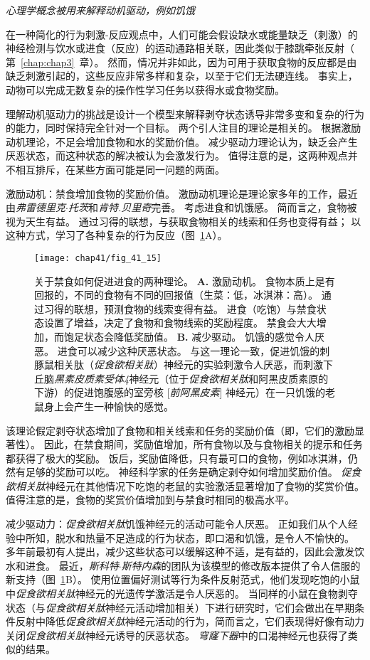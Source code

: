 \textit{心理学概念被用来解释动机驱动，例如饥饿}

在一种简化的行为刺激-反应观点中，人们可能会假设缺水或能量缺乏（刺激）的神经检测与饮水或进食（反应）的运动通路相关联，因此类似于膝跳牵张反射（ 第~\ref{chap:chap3}~章）。
然而，情况并非如此，因为可用于获取食物的反应都是由缺乏刺激引起的，这些反应非常多样和复杂，以至于它们无法硬连线。
事实上，动物可以完成无数复杂的操作性学习任务以获得水或食物奖励。


理解动机驱动力的挑战是设计一个模型来解释剥夺状态诱导非常多变和复杂的行为的能力，同时保持完全针对一个目标。 两个引人注目的理论是相关的。
根据激励动机理论，不足会增加食物和水的奖励价值。 减少驱动力理论认为，缺乏会产生厌恶状态，而这种状态的解决被认为会激发行为。
值得注意的是，这两种观点并不相互排斥，在某些方面可能是同一问题的两面。


激励动机：禁食增加食物的奖励价值。
激励动机理论是理论家多年的工作，最近由\textit{弗雷德里克$\cdot$托茨}和\textit{肯特.贝里奇}完善。
考虑进食和饥饿感。
简而言之，食物被视为天生有益。
通过习得的联想，与获取食物相关的线索和任务也变得有益；
以这种方式，学习了各种复杂的行为反应（图~\ref{fig:41_15}A）。


\begin{figure}[htbp]
	\centering
	\texttt{[image: chap41/fig\_41\_15]}
	\caption{关于禁食如何促进进食的两种理论。 
		\textbf{A.} 激励动机。 食物本质上是有回报的，不同的食物有不同的回报值（生菜：低，冰淇淋：高）。
		通过习得的联想，预测食物的线索变得有益。 进食（吃饱）与禁食状态设置了增益，决定了食物和食物线索的奖励程度。
		禁食会大大增加，而饱足状态会降低奖励值。
		\textbf{B.} 减少驱动。
		饥饿的感觉令人厌恶。
		进食可以减少这种厌恶状态。
		与这一理论一致，促进饥饿的刺豚鼠相关肽（\textit{促食欲相关肽}）神经元的实验刺激令人厌恶，而刺激下丘脑\textit{黑素皮质素受体4}神经元（位于\textit{促食欲相关肽}和阿黑皮质素原的下游）的促进饱腹感的室旁核 [\textit{前阿黑皮素}] 神经元）在一只饥饿的老鼠身上会产生一种愉快的感觉。}
	\label{fig:41_15}
\end{figure}


该理论假定剥夺状态增加了食物和相关线索和任务的奖励价值（即，它们的激励显著性）。
因此，在禁食期间，奖励值增加，所有食物以及与食物相关的提示和任务都获得了极大的奖励。
饭后，奖励值降低，只有最可口的食物，例如冰淇淋，仍然有足够的奖励可以吃。
神经科学家的任务是确定剥夺如何增加奖励价值。
\textit{促食欲相关肽}神经元在其他情况下吃饱的老鼠的实验激活显著增加了食物的奖赏价值。值得注意的是，食物的奖赏价值增加到与禁食时相同的极高水平。


减少驱动力：\textit{促食欲相关肽}饥饿神经元的活动可能令人厌恶。
正如我们从个人经验中所知，脱水和热量不足造成的行为状态，即口渴和饥饿，是令人不愉快的。
多年前最初有人提出，减少这些状态可以缓解这种不适，是有益的，因此会激发饮水和进食。
最近，\textit{斯科特$\cdot$斯特内森}的团队为该模型的修改版本提供了令人信服的新支持（图~\ref{fig:41_15}B）。
使用位置偏好测试等行为条件反射范式，他们发现吃饱的小鼠中\textit{促食欲相关肽}神经元的光遗传学激活是令人厌恶的。
当同样的小鼠在食物剥夺状态（与\textit{促食欲相关肽}神经元活动增加相关）下进行研究时，它们会做出在早期条件反射中降低\textit{促食欲相关肽}神经元活动的行为，简而言之，它们表现得好像有动力关闭\textit{促食欲相关肽}神经元诱导的厌恶状态。
\textit{穹窿下器}中的口渴神经元也获得了类似的结果。


